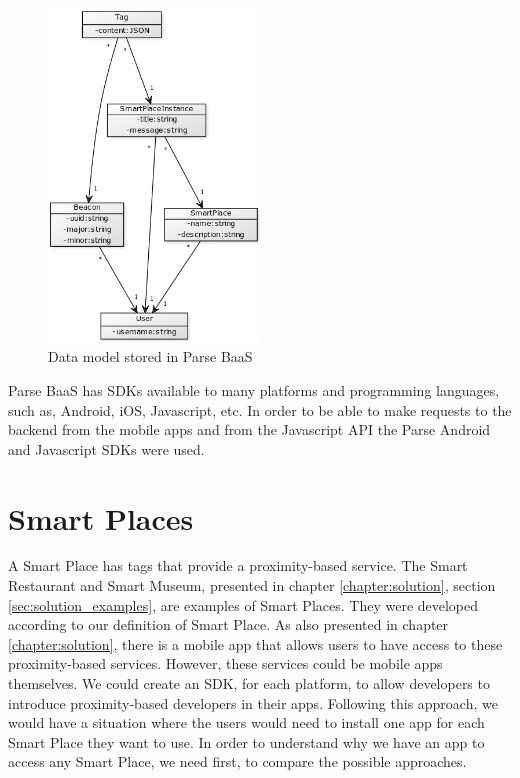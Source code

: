 \begin{figure}[!ht]
  \centering
    \includegraphics[width=0.5\textwidth]{images/backend_data_model}
    \caption[Data model]{Data model stored in Parse \gls{BaaS}}
    \label{fig:backend_data_model}
\end{figure}

Parse \gls{BaaS} has \glspl{SDK} available to many platforms and programming
languages, such as, Android, iOS, Javascript, etc.
In order to be able to make requests to the backend from the mobile apps and
from the Javascript API
the Parse Android and Javascript \glspl{SDK} were used.

\section{Smart Places}
\label{sec:implementation_smart_places}
A Smart Place has tags that provide a proximity-based service.
The Smart Restaurant and Smart Museum, presented in chapter \ref{chapter:solution}, section \ref{sec:solution_examples}, are examples of Smart Places.
They were developed according to our definition of Smart Place.
As also presented in chapter \ref{chapter:solution}, there is a mobile app that allows users to have access to these proximity-based services.
However, these services could be mobile apps themselves.
We could create an \gls{SDK}, for each platform, to allow developers to introduce proximity-based developers in their apps.
Following this approach, we would have a situation where the users would need to install one app for each Smart Place they want to use.
In order to understand why we have an app to access any Smart Place, we need first, to compare the possible approaches.

